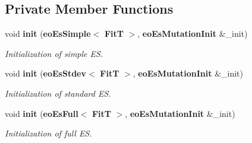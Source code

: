 \subsection*{Private Member Functions}
\begin{CompactItemize}
\item 
void {\bf init} ({\bf eo\-Es\-Simple}$<$ {\bf Fit\-T} $>$, {\bf eo\-Es\-Mutation\-Init} \&\_\-init)\label{classeo_es_mutate_d0}

\begin{CompactList}\small\item\em Initialization of simple ES. \item\end{CompactList}\item 
void {\bf init} ({\bf eo\-Es\-Stdev}$<$ {\bf Fit\-T} $>$, {\bf eo\-Es\-Mutation\-Init} \&\_\-init)
\begin{CompactList}\small\item\em Initialization of standard ES. \item\end{CompactList}\item 
void {\bf init} ({\bf eo\-Es\-Full}$<$ {\bf Fit\-T} $>$, {\bf eo\-Es\-Mutation\-Init} \&\_\-init)
\begin{CompactList}\small\item\em Initialization of full ES. \item\end{CompactList}\end{CompactItemize}

